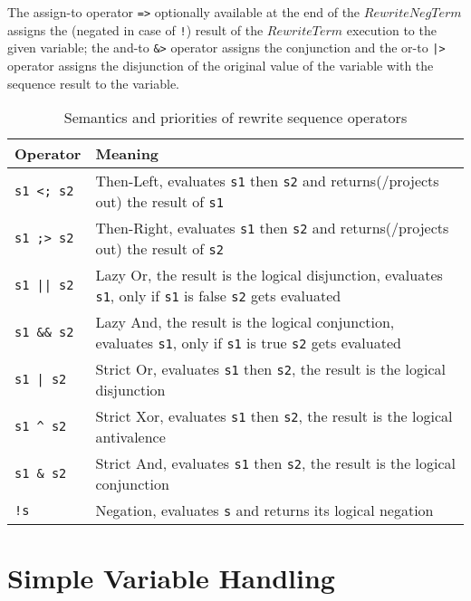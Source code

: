 The assign-to operator \texttt{=>} optionally available at the end of the $RewriteNegTerm$ assigns the (negated in case of \texttt{!}) result of the $RewriteTerm$ execution to the given variable; the and-to \texttt{\&>} operator assigns the conjunction and the or-to \texttt{|>} operator assigns the disjunction of the original value of the variable with the sequence result to the variable.

\begin{table}[htbp]
    \begin{tabularx}{\linewidth}{l|X}
        \bf Operator & \bf Meaning \\\hline\hline
        \verb/s1 <; s2/ & Then-Left, evaluates \texttt{s1} then \texttt{s2} and returns(/projects out) the result of \texttt{s1}\\
		\verb/s1 ;> s2/ & Then-Right, evaluates \texttt{s1} then \texttt{s2} and returns(/projects out) the result of \texttt{s2}\\\hline
        \verb/s1 || s2/ & Lazy Or, the result is the logical disjunction, evaluates \texttt{s1}, only if \texttt{s1} is false \texttt{s2} gets evaluated\\\hline
        \verb/s1 && s2/ & Lazy And, the result is the logical conjunction, evaluates \texttt{s1}, only if \texttt{s1} is true \texttt{s2} gets evaluated\\\hline
        \verb/s1 | s2/ & Strict Or, evaluates \texttt{s1} then \texttt{s2}, the result is the logical disjunction\\\hline
        \verb/s1 ^ s2/ & Strict Xor, evaluates \texttt{s1} then \texttt{s2}, the result is the logical antivalence\\\hline
        \verb/s1 & s2/ & Strict And, evaluates \texttt{s1} then \texttt{s2}, the result is the logical conjunction\\\hline
        \verb/!s/ & Negation, evaluates \texttt{s} and returns its logical negation\\\hline
	\end{tabularx}    
    \caption{Semantics and priorities of rewrite sequence operators}
    \label{tbl:sequ:op}
\end{table}


\section{Simple Variable Handling}\label{sec:simplevarhandling}

